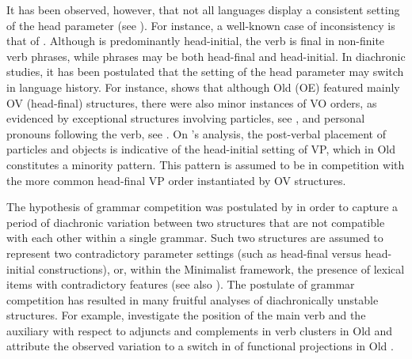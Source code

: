 \documentclass[output=paper,modfonts,newtxmath,hidelinks]{langscibook}
\begin{document}
It has been observed, however, that not all languages display a consistent setting of the head parameter (see \citealt{Hawkins1980,Hawkins1982}). For instance, a well-known case of inconsistency is that of . Although  is predominantly head-initial, the verb is final in non-finite verb phrases, while  phrases may be both head-final and head-initial. In diachronic studies, it has been postulated that the setting of the head parameter may switch in language history. For instance, \citet{pintzuk1991}
shows that although Old  (OE) featured mainly OV (head-final) structures, there were also minor instances of VO orders, as evidenced by exceptional structures involving particles, see , and personal pronouns following the verb, see .
\ea \label{11:ex1}
	\z 
\z
On \citeauthor{pintzuk1991}’s analysis, the post-verbal placement of particles and objects is indicative of the head-initial setting of VP, which in Old  constitutes a minority pattern. This pattern is assumed to be in competition with the more common head-final VP order instantiated by OV structures.

The hypothesis of grammar competition was postulated by \citet{kroch1989} in order to capture a period of diachronic variation between two structures that are not compatible with each other within a single grammar. Such two structures are assumed to represent two contradictory parameter settings (such as head-final versus head-initial constructions), or, within the Minimalist framework, the presence of lexical items with contradictory features (see also \citealt[278]{pintzuk2002}). The postulate of grammar competition has resulted in many fruitful analyses of diachronically unstable structures. For example, \citet{haeberli-pintzuk2006} investigate the position of the main verb and the auxiliary with respect to adjuncts and complements in verb clusters in Old  and attribute the observed  variation to a switch in  of functional projections in Old .
\end{document}
